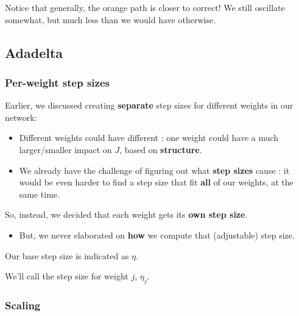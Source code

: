             Notice that generally, the orange path is closer to correct! We still oscillate somewhat, but much less than we would have otherwise.

            \pagebreak

            
            

            

    \subsection{Adadelta}    

        \subsubsection{Per-weight step sizes}

            Earlier, we discussed creating \textbf{separate} step sizes for different weights in our network:
    
            \begin{itemize}
                \item Different weights could have different : one weight could have a much larger/smaller impact on $J$, based on \textbf{structure}.
    
                \item We already have the challenge of figuring out what \textbf{step sizes} cause : it would be even harder to find a step size that fit \textbf{all} of our weights, at the same time.
            \end{itemize}
    
            So, instead, we decided that each weight gets its \textbf{own step size}. 

            \begin{itemize}
                \item But, we never elaborated on \textbf{how} we compute that (adjustable) step size.\\
            \end{itemize}

            \begin{notation}
                Our base step size is indicated as $\eta$. 
                
                We'll call the  step size for weight $j$, $\eta_j$.
            \end{notation}
            

        \subsubsection{Scaling}

